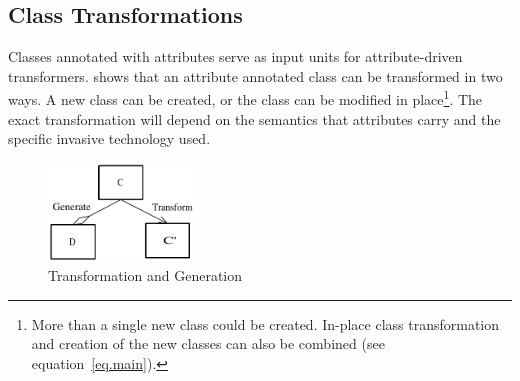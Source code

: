 \subsection{Class Transformations}
\label{attrib.trans}

Classes annotated with attributes serve as input units for attribute-driven transformers.  shows that an attribute annotated class can be transformed in two ways. A new class can be created, or the class can be modified in place\footnote{More than a single new class could be created. In-place class transformation and creation of the new classes can also be combined (see equation~\ref{eq.main}).}. The exact transformation will depend on the semantics that attributes carry and the specific invasive technology used.

\begin{figure}[ht]
		\centering
		\includegraphics[width=4cm,height=!]{ch02/transgen}
	\caption{Transformation and Generation}
	\label{fig:ch04tg}
\end{figure}

